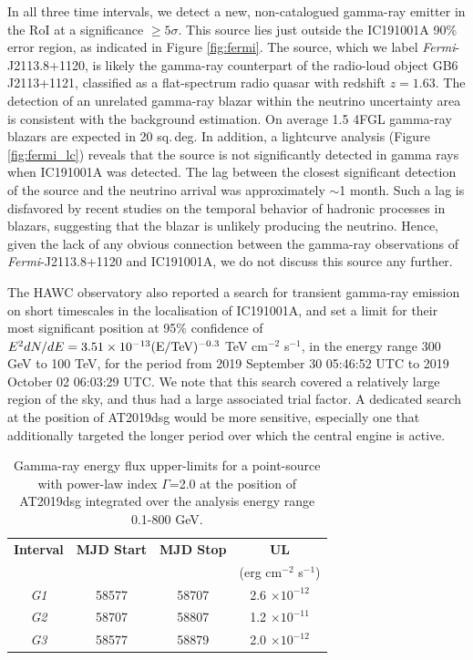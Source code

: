 \documentclass{nature_plusfigure}
\begin{document}
\begin{methods}
In all three time intervals, we detect a new, non-catalogued gamma-ray emitter in the RoI at a significance $\geq 5 \sigma$. This source lies just outside the IC191001A 90$\%$ error region, as indicated in Figure \ref{fig:fermi}. The source, which we label \textit{Fermi}-J2113.8+1120, is likely the gamma-ray counterpart of the radio-loud object GB6 J2113+1121, classified as a flat-spectrum radio quasar with redshift $z = 1.63$\cite{2013ApJ...767...14P}. The detection of an unrelated gamma-ray blazar within the neutrino uncertainty area is consistent with the background estimation. On average 1.5 4FGL gamma-ray blazars are expected in 20 sq.\,deg. In addition, a lightcurve analysis (Figure \ref{fig:fermi_lc}) reveals that the source is not significantly detected in gamma rays when IC191001A was detected. The lag between the closest significant detection of the source and the neutrino arrival was approximately $\sim$1 month. Such a lag is disfavored by recent studies on the temporal behavior of hadronic processes in blazars\cite{2015ApJ...802..133D,2019NatAs...3...88G}, suggesting that the blazar is unlikely producing the neutrino. %
Hence, given the lack of any obvious connection between the gamma-ray observations of \textit{Fermi}-J2113.8+1120 and IC191001A, we do not discuss this source any further.

The HAWC observatory also reported a search for transient gamma-ray emission on short timescales in the localisation of IC191001A\cite{ayala:gcn25936}, and set a limit for their most significant position at 95\% confidence of $E^{2} dN/dE = 3.51 \times 10^{-13} (\textup{E}/\textup{TeV})^{-0.3}$ TeV cm$^{-2}$ s$^{-1}$, in the energy range 300 GeV to 100 TeV, for the period from 2019 September 30 05:46:52 UTC to 2019 October 02 06:03:29 UTC. We note that this search covered a relatively large region of the sky, and thus had a large associated trial factor. A dedicated search at the position of AT2019dsg would be more sensitive, especially one that additionally targeted the longer period over which the central engine is active.

\begin{table}
\centering
	\begin{tabular}{||c c c c||} 
		\hline
		\textbf{Interval} & \textbf{MJD Start} & \textbf{MJD Stop} & \textbf{UL}\\
		& & &  (erg cm$^{-2}$ s$^{-1}$)\\
		\hline
		\textit{G1} & 58577 & 58707 & 2.6 $\times 10^{-12}$\\
		\textit{G2} & 58707 & 58807 & 1.2 $\times 10^{-11}$\\
		\textit{G3} & 58577 & 58879 & 2.0 $\times 10^{-12}$\\
		\hline
	\end{tabular}
	\caption{Gamma-ray energy flux upper-limits for a point-source with power-law index $\Gamma$=2.0 at the position of AT2019dsg integrated over the analysis energy range 0.1-800 GeV.}
	\label{tab:lat_uls}
\end{table}


\end{methods}
\end{document}
